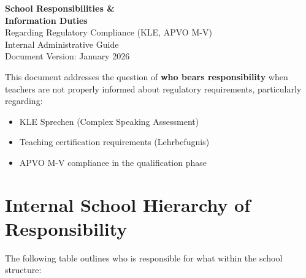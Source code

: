 \documentclass[11pt,a4paper]{article}
\begin{document}
\begin{center}
    {\LARGE\bfseries\color{primaryblue} School Responsibilities \&\\[0.3em] Information Duties}\\[1em]
    {\large Regarding Regulatory Compliance (KLE, APVO M-V)}\\[0.5em]
    {\normalsize Internal Administrative Guide}\\[2em]
    {\small Document Version: January 2026}
\end{center}

\vspace{1em}

\begin{warningbox}
This document addresses the question of \textbf{who bears responsibility} when teachers are not properly informed about regulatory requirements, particularly regarding:
\begin{itemize}[nosep]
    \item KLE Sprechen (Complex Speaking Assessment)
    \item Teaching certification requirements (Lehrbefugnis)
    \item APVO M-V compliance in the qualification phase
\end{itemize}
\end{warningbox}

\vspace{1em}

\section{Internal School Hierarchy of Responsibility}

The following table outlines who is responsible for what within the school structure:
\end{document}
